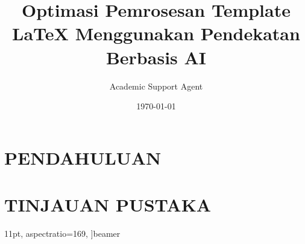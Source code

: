 \documentclass{beamer}
\title{Optimasi Pemrosesan Template LaTeX Menggunakan Pendekatan Berbasis AI}
\author{Academic Support Agent}
\date{\today}
\begin{document}
\maketitle

\begin{abstract}

\end{abstract}

\chapter{PENDAHULUAN}


\chapter{TINJAUAN PUSTAKA}


    11pt, %
    aspectratio=169, %
]{beamer}


\graphicspath{{images/}{./}} %
\usepackage{booktabs} %
\usepackage{calligra} %
\usepackage{fnpct} %
\usepackage{listings} %

\usepackage[style=numeric, sorting=none, backend=biber]{biblatex}

\usepackage{xpatch}
\end{document}

